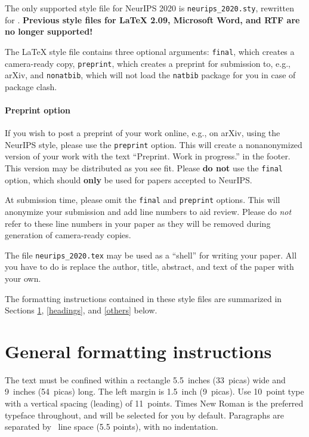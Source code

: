 \documentclass{article}
\begin{document}
The only supported style file for NeurIPS 2020 is \verb+neurips_2020.sty+,
rewritten for \LaTeXe{}.  \textbf{Previous style files for \LaTeX{} 2.09,
  Microsoft Word, and RTF are no longer supported!}

The \LaTeX{} style file contains three optional arguments: \verb+final+, which
creates a camera-ready copy, \verb+preprint+, which creates a preprint for
submission to, e.g., arXiv, and \verb+nonatbib+, which will not load the
\verb+natbib+ package for you in case of package clash.

\paragraph{Preprint option}
If you wish to post a preprint of your work online, e.g., on arXiv, using the
NeurIPS style, please use the \verb+preprint+ option. This will create a
nonanonymized version of your work with the text ``Preprint. Work in progress.''
in the footer. This version may be distributed as you see fit. Please \textbf{do
  not} use the \verb+final+ option, which should \textbf{only} be used for
papers accepted to NeurIPS.

At submission time, please omit the \verb+final+ and \verb+preprint+
options. This will anonymize your submission and add line numbers to aid
review. Please do \emph{not} refer to these line numbers in your paper as they
will be removed during generation of camera-ready copies.

The file \verb+neurips_2020.tex+ may be used as a ``shell'' for writing your
paper. All you have to do is replace the author, title, abstract, and text of
the paper with your own.

The formatting instructions contained in these style files are summarized in
Sections \ref{gen_inst}, \ref{headings}, and \ref{others} below.

\section{General formatting instructions}
\label{gen_inst}

The text must be confined within a rectangle 5.5~inches (33~picas) wide and
9~inches (54~picas) long. The left margin is 1.5~inch (9~picas).  Use 10~point
type with a vertical spacing (leading) of 11~points.  Times New Roman is the
preferred typeface throughout, and will be selected for you by default.
Paragraphs are separated by ~line space (5.5 points), with no
indentation.
\end{document}
